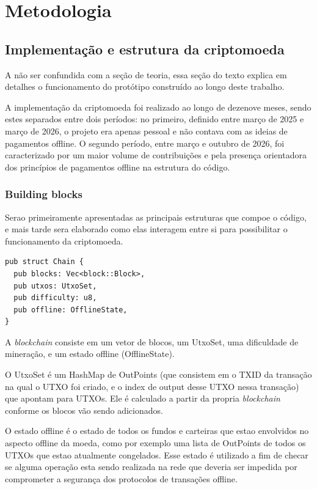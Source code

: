 \documentclass[
  12pt,
  a4paper,
  oneside,
  article,
]{abntex2}
\begin{document}
\section{Metodologia}

\subsection{Implementação e estrutura da criptomoeda}

A não ser confundida com a seção de teoria, essa seção do texto explica em detalhes o funcionamento do protótipo construído ao longo deste trabalho.

A implementação da criptomoeda foi realizado ao longo de dezenove meses, sendo estes separados entre dois períodos: no primeiro, definido entre março de 2025 e março de 2026, o projeto era apenas pessoal e não contava com as ideias de pagamentos offline. O segundo período, entre março e outubro de 2026, foi caracterizado por um maior volume de contribuições e pela presença orientadora dos princípios de pagamentos offline na estrutura do código.

\subsubsection{Building blocks}


Serao primeiramente apresentadas as principais estruturas que compoe o código, e mais tarde sera elaborado como elas interagem entre si para possibilitar o funcionamento da criptomoeda.



\begin{verbatim}
pub struct Chain {
  pub blocks: Vec<block::Block>,
  pub utxos: UtxoSet,
  pub difficulty: u8,
  pub offline: OfflineState,
}
\end{verbatim}

A \textit{blockchain} consiste em um vetor de blocos, um UtxoSet, uma dificuldade de mineração, e um estado offline (OfflineState).

O UtxoSet é um HashMap de OutPoints (que consistem em o TXID da transação na qual o UTXO foi criado, e o index de output desse UTXO nessa transação) que apontam para UTXOs. Ele é calculado a partir da propria \textit{blockchain} conforme os blocos vão sendo adicionados.

O estado offline é o estado de todos os fundos e carteiras que estao envolvidos no aspecto offline da moeda, como por exemplo uma lista de OutPoints de todos os UTXOs que estao atualmente congelados. Esse estado é utilizado a fim de checar se alguma operação esta sendo realizada na rede que deveria ser impedida por comprometer a segurança dos protocolos de transações offline.
\end{document}
